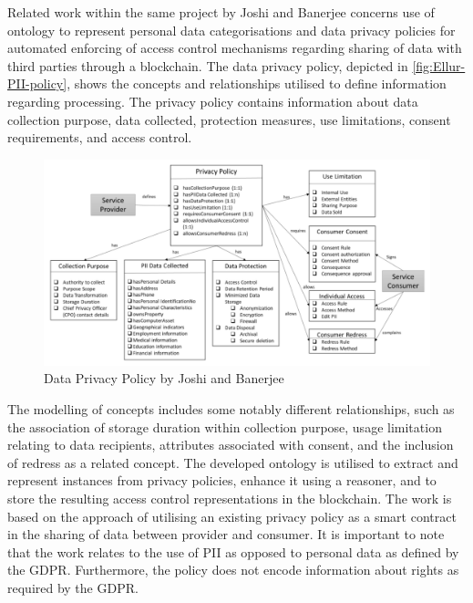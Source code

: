 Related work within the same project by Joshi and Banerjee  \cite{joshi_automating_2019} concerns use of ontology to represent personal data categorisations and data privacy policies for automated enforcing of access control mechanisms regarding sharing of data with third parties through a blockchain. The data privacy policy, depicted in \autoref{fig:Ellur-PII-policy}, shows the concepts and relationships utilised to define information regarding processing. The privacy policy contains information about data collection purpose, data collected, protection measures, use limitations, consent requirements, and access control.
\begin{figure}[htbp]
    \centering
    \includegraphics[width=\linewidth]{img/Elluri_PII_policy.png}
    \caption{Data Privacy Policy by Joshi and Banerjee \cite{joshi_automating_2019}}
    \label{fig:Ellur-PII-policy}
\end{figure}

The modelling of concepts includes some notably different relationships, such as the association of storage duration within collection purpose, usage limitation relating to data recipients, attributes associated with consent, and the inclusion of redress as a related concept. The developed ontology is utilised to extract and represent instances from privacy policies, enhance it using a reasoner, and to store the resulting access control representations in the blockchain. The work is based on the approach of utilising an existing privacy policy as a smart contract in the sharing of data between provider and consumer.
It is important to note that the work relates to the use of PII as opposed to personal data as defined by the GDPR. Furthermore, the policy does not encode information about rights as required by the GDPR.

